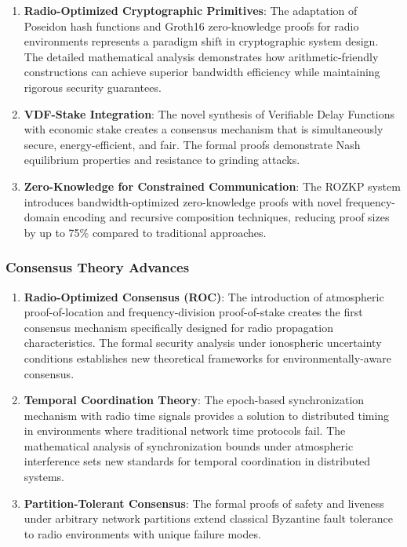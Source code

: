 \documentclass[11pt,a4paper]{article}
\begin{document}
\begin{enumerate}
\item \textbf{Radio-Optimized Cryptographic Primitives}: The adaptation of Poseidon hash functions and Groth16 zero-knowledge proofs for radio environments represents a paradigm shift in cryptographic system design. The detailed mathematical analysis demonstrates how arithmetic-friendly constructions can achieve superior bandwidth efficiency while maintaining rigorous security guarantees.

\item \textbf{VDF-Stake Integration}: The novel synthesis of Verifiable Delay Functions with economic stake creates a consensus mechanism that is simultaneously secure, energy-efficient, and fair. The formal proofs demonstrate Nash equilibrium properties and resistance to grinding attacks.

\item \textbf{Zero-Knowledge for Constrained Communication}: The ROZKP system introduces bandwidth-optimized zero-knowledge proofs with novel frequency-domain encoding and recursive composition techniques, reducing proof sizes by up to 75\% compared to traditional approaches.
\end{enumerate}

\subsubsection{Consensus Theory Advances}

\begin{enumerate}
\item \textbf{Radio-Optimized Consensus (ROC)}: The introduction of atmospheric proof-of-location and frequency-division proof-of-stake creates the first consensus mechanism specifically designed for radio propagation characteristics. The formal security analysis under ionospheric uncertainty conditions establishes new theoretical frameworks for environmentally-aware consensus.

\item \textbf{Temporal Coordination Theory}: The epoch-based synchronization mechanism with radio time signals provides a solution to distributed timing in environments where traditional network time protocols fail. The mathematical analysis of synchronization bounds under atmospheric interference sets new standards for temporal coordination in distributed systems.

\item \textbf{Partition-Tolerant Consensus}: The formal proofs of safety and liveness under arbitrary network partitions extend classical Byzantine fault tolerance to radio environments with unique failure modes.
\end{enumerate}
\end{document}
